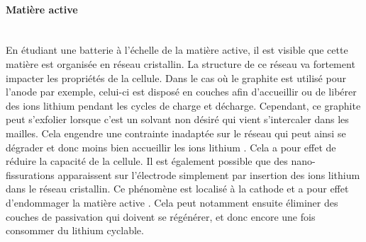 \paragraph{Matière active}\hfill \\
En étudiant une batterie à l'échelle de la matière active, il est visible que cette matière est organisée en réseau cristallin. La structure de ce réseau va fortement impacter les propriétés de la cellule. Dans le cas où le graphite est utilisé pour l'anode par exemple, celui-ci est disposé en couches afin d'accueillir ou de libérer des ions lithium pendant les cycles de charge et décharge. Cependant, ce graphite peut s'exfolier lorsque c'est un solvant non désiré qui vient s'intercaler dans les mailles. Cela engendre une contrainte inadaptée sur le réseau qui peut ainsi se dégrader et donc moins bien accueillir les ions lithium \cite{shi_effect_2017}\cite{vetter_ageing_2005}. Cela a pour effet de réduire la capacité de la cellule. Il est également possible que des nano-fissurations apparaissent sur l'électrode simplement par insertion des ions lithium dans le réseau cristallin. Ce phénomène est localisé à la cathode et a pour effet d'endommager la matière active \cite{hausbrand_fundamental_2015}. Cela peut notamment ensuite éliminer des couches de passivation qui doivent se régénérer, et donc encore une fois consommer du lithium cyclable.

